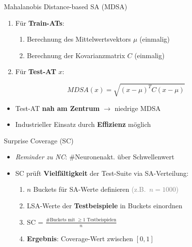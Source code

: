 \documentclass[usenames, dvipsnames, aspectratio=32]{beamer}
\begin{document}
\begin{frame}{Mahalanobis Distance-based SA (MDSA)}
    \begin{enumerate}
        \item Für \textbf{Train-ATs}:
        \begin{enumerate}
            \item Berechnung des Mittelwertsvektors $\mu$ (einmalig) \vspace{.3em}
            \item Berechnung der Kovarianzmatrix $C$ (einmalig) \vspace{.2em}
        \end{enumerate}
        \item Für \textbf{Test-AT} $x$:
    \end{enumerate}
    $$MDSA(x) = \sqrt{(x - \mu)^T C (x - \mu)}$$ \vspace{-.2em} %
    \begin{itemize}
        \item Test-AT \textbf{nah am Zentrum} $\to$ niedrige MDSA %
        \item Industrieller Einsatz durch \textbf{Effizienz} möglich %
    \end{itemize}
\end{frame}

\begin{frame}{Surprise Coverage (SC)}
    \begin{itemize}
        \item \textit{Reminder zu NC}: \#Neuronenakt. über Schwellenwert %
        \item SC prüft \textbf{Vielfältigkeit} der Test-Suite via SA-Verteilung:\vspace{.3em}
        \begin{enumerate}
            \item $n$ Buckets für SA-Werte definieren \textcolor{gray}{(z.B.\, $n=1000$)} \vspace{.3em}
            \item LSA-Werte der \textbf{Testbeispiele} in Buckets einordnen \vspace{.6em} %
            \item SC = $\displaystyle\frac{\#\text{Buckets mit } \geq 1\text{ Testbeispielen}}{n}$ \vspace{.5em}
            \item \textbf{Ergebnis}: Coverage-Wert zwischen $[0,1]$
        \end{enumerate} 
    \end{itemize}
\end{frame}
\end{document}

